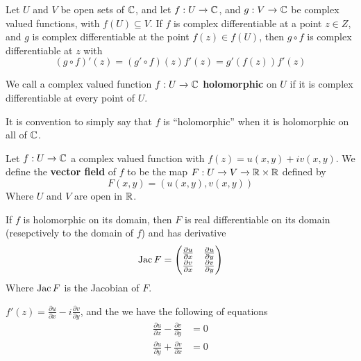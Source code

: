 \begin{theorem}\label{theorem_1.3.2}
    Let $U$ and $V$ be open sets of  $\mathbb{C}$, and let  $f:U \xrightarrow{} \mathbb{C}$, and
    $g:V \xrightarrow{} \mathbb{C}$ be complex valued functions, with $f(U) \subseteq
    V$. If $f$ is complex differentiable at a point $z \in Z$, and $g$ is
    complex differentiable at the point $f(z) \in f(U)$, then $g \circ f$ is
    complex differentiable at $z$ with
    \begin{equation*}
        (g \circ f)'(z)=(g' \circ f)(z)f'(z) =g'(f(z))f'(z)
    \end{equation*}
\end{theorem}

\begin{definition}
    We call a complex valued function $f:U \xrightarrow{} \mathbb{C}$
    \textbf{holomorphic} on $U$ if it is complex differentiable at every point
    of $U$.
\end{definition}
\begin{remark}
    It is convention to simply say that $f$ is ``holomorphic'' when it is
    holomorphic on all of $\mathbb{C}$.
\end{remark}

\begin{definition}
    Let $f:U \xrightarrow{} \mathbb{C}$ a complex valued function with
    $f(z)=u(x,y)+iv(x,y)$. We define the \textbf{vector field} of $f$ to be the
    map  $F:U \xrightarrow{} V \xrightarrow{} \mathbb{R} \times \mathbb{R}$ defined by
    \begin{equation*}
        F(x,y)=(u(x,y),v(x,y))
    \end{equation*}
    Where $U$ and $V$ are open in $\mathbb{R}$.
\end{definition}

\begin{theorem}\label{1.3.3}
    If $f$ is holomorphic on its domain, then $F$ is real differentiable on its
    domain (resepctively to the domain of $f$) and has derivative
    \begin{equation*}
        \operatorname{Jac}{F}=\begin{pmatrix}
                    \frac{\partial{u}}{\partial{x}} & \frac{\partial{u}}{\partial{y}} \\
                    \frac{\partial{v}}{\partial{x}} & \frac{\partial{v}}{\partial{y}} \\
                \end{pmatrix}
    \end{equation*}
    Where $\operatorname{Jac}{F}$ is the Jacobian of $F$.
\end{theorem}
\begin{corollary}
    $f'(z)=\frac{\partial{u}}{\partial{x}}-i\frac{\partial{v}}{\partial{y}}$,
    and the we have the following of equations
    \begin{align*}
        \frac{\partial{u}}{\partial{x}}-\frac{\partial{v}}{\partial{y}} &=0 \\
        \frac{\partial{u}}{\partial{y}}+\frac{\partial{v}}{\partial{x}} &=0 \\
    \end{align*}
\end{corollary}

